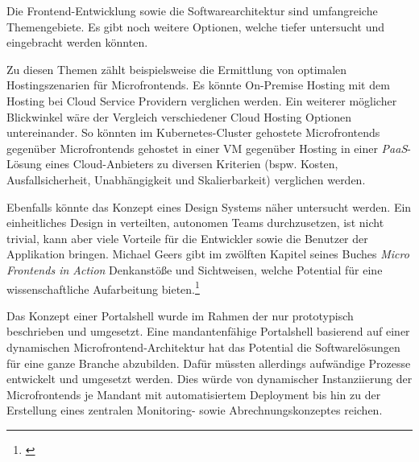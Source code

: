 Die Frontend-Entwicklung sowie die Softwarearchitektur sind umfangreiche Themengebiete. Es gibt noch weitere Optionen, welche tiefer untersucht und eingebracht werden könnten.

Zu diesen Themen zählt beispielsweise die Ermittlung von optimalen Hostingszenarien für Microfrontends. Es könnte On-Premise Hosting mit dem Hosting bei Cloud Service Providern verglichen werden. Ein weiterer möglicher Blickwinkel wäre der Vergleich verschiedener Cloud Hosting Optionen untereinander. So könnten im Kubernetes-Cluster gehostete Microfrontends gegenüber Microfrontends gehostet in einer \gls{VM} gegenüber Hosting in einer \textit{\gls{PaaS}}-Lösung eines Cloud-Anbieters zu diversen Kriterien (bspw. Kosten, Ausfallsicherheit, Unabhängigkeit und Skalierbarkeit) verglichen werden.

Ebenfalls könnte das Konzept eines Design Systems näher untersucht werden. Ein einheitliches Design in verteilten, autonomen Teams durchzusetzen, ist nicht trivial, kann aber viele Vorteile für die Entwickler sowie die Benutzer der Applikation bringen. Michael Geers gibt im zwölften Kapitel seines Buches \textit{Micro Frontends in Action} Denkanstöße und Sichtweisen, welche Potential für eine wissenschaftliche Aufarbeitung bieten.\footnote{\cite[vgl.][213]{Geers2020}}

Das Konzept einer Portalshell wurde im Rahmen der \dokumententyp{} nur prototypisch beschrieben und umgesetzt. Eine mandantenfähige Portalshell basierend auf einer dynamischen Microfrontend-Architektur hat das Potential die Softwarelösungen für eine ganze Branche abzubilden. Dafür müssten allerdings aufwändige Prozesse entwickelt und umgesetzt werden. Dies würde von dynamischer Instanziierung der Microfrontends je Mandant mit automatisiertem Deployment bis hin zu der Erstellung eines zentralen Monitoring- sowie Abrechnungskonzeptes reichen.